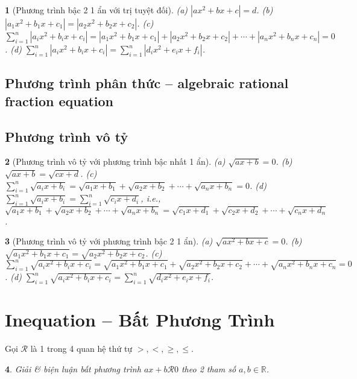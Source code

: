\documentclass{article}
\newtheorem{baitoan}{}
\begin{document}
\begin{baitoan}[Phương trình bậc 2 1 ẩn với trị tuyệt đối]
	(a) $|ax^2 + bx + c| = d$. (b) $|a_1x^2 + b_1x + c_1| = |a_2x^2 + b_2x + c_2|$. (c) $\sum_{i=1}^n |a_ix^2 + b_ix + c_i| = |a_1x^2 + b_1x + c_1| + |a_2x^2 + b_2x + c_2| + \cdots + |a_nx^2 + b_nx + c_n| = 0$. (d) $\sum_{i=1}^n |a_ix^2 + b_ix + c_i| = \sum_{i=1}^n |d_ix^2 + e_ix + f_i|$.
\end{baitoan}

\subsection{Phương trình phân thức -- algebraic rational fraction equation}

\subsection{Phương trình vô tỷ}

\begin{baitoan}[Phương trình vô tỷ với phương trình bậc nhất 1 ẩn]
	(a) $\sqrt{ax + b} = 0$. (b) $\sqrt{ax + b} = \sqrt{cx + d}$. (c) $\sum_{i=1}^n \sqrt{a_ix + b_i} = \sqrt{a_1x + b_1} + \sqrt{a_2x + b_2} + \cdots + \sqrt{a_nx + b_n} = 0$. (d) $\sum_{i=1}^n \sqrt{a_ix + b_i} = \sum_{i=1}^n \sqrt{c_ix + d_i}$, i.e., $\sqrt{a_1x + b_1} + \sqrt{a_2x + b_2} + \cdots + \sqrt{a_nx + b_n} = \sqrt{c_1x + d_1} + \sqrt{c_2x + d_2} + \cdots + \sqrt{c_nx + d_n}$.
\end{baitoan}

\begin{baitoan}[Phương trình vô tỷ với phương trình bậc 2 1 ẩn]
	(a) $\sqrt{ax^2 + bx + c} = 0$. (b) $\sqrt{a_1x^2 + b_1x + c_1} = \sqrt{a_2x^2 + b_2x + c_2}$. (c) $\sum_{i=1}^n \sqrt{a_ix^2 + b_ix + c_i} = \sqrt{a_1x^2 + b_1x + c_1} + \sqrt{a_2x^2 + b_2x + c_2} + \cdots + \sqrt{a_nx^2 + b_nx + c_n} = 0$. (d) $\sum_{i=1}^n \sqrt{a_ix^2 + b_ix + c_i} = \sum_{i=1}^n \sqrt{d_ix^2 + e_ix + f_i}$.
\end{baitoan}


\section{Inequation -- Bất Phương Trình}
Gọi $\mathcal{R}$ là 1 trong 4 quan hệ thứ tự $>,<,\ge,\le$.

\begin{baitoan}
	Giải \& biện luận bất phương trình $ax + b\mathcal{R} 0$ theo 2 tham số $a,b\in\mathbb{R}$.
\end{baitoan}
\end{document}
